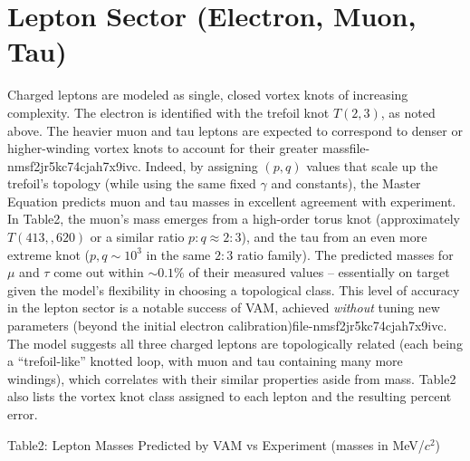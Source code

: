 \section*{Lepton Sector (Electron, Muon, Tau)}

Charged leptons are modeled as single, closed vortex knots of increasing complexity. The electron is identified with the trefoil knot $T(2,3)$, as noted above. The heavier muon and tau leptons are expected to correspond to denser or higher-winding vortex knots to account for their greater massfile-nmsf2jr5kc74cjah7x9ivc. Indeed, by assigning $(p,q)$ values that scale up the trefoil’s topology (while using the same fixed $\gamma$ and constants), the Master Equation predicts muon and tau masses in excellent agreement with experiment. In Table2, the muon’s mass emerges from a high-order torus knot (approximately $T(413,,620)$ or a similar ratio $p:q\approx2:3$), and the tau from an even more extreme knot ($p,q\sim10^3$ in the same $2:3$ ratio family). The predicted masses for $\mu$ and $\tau$ come out within $\sim0.1\%$ of their measured values – essentially on target given the model’s flexibility in choosing a topological class. This level of accuracy in the lepton sector is a notable success of VAM, achieved \textit{without} tuning new parameters (beyond the initial electron calibration)file-nmsf2jr5kc74cjah7x9ivc. The model suggests all three charged leptons are topologically related (each being a “trefoil-like” knotted loop, with muon and tau containing many more windings), which correlates with their similar properties aside from mass. Table2 also lists the vortex knot class assigned to each lepton and the resulting percent error.


Table2: Lepton Masses Predicted by VAM vs Experiment (masses in MeV/$c^2$)


